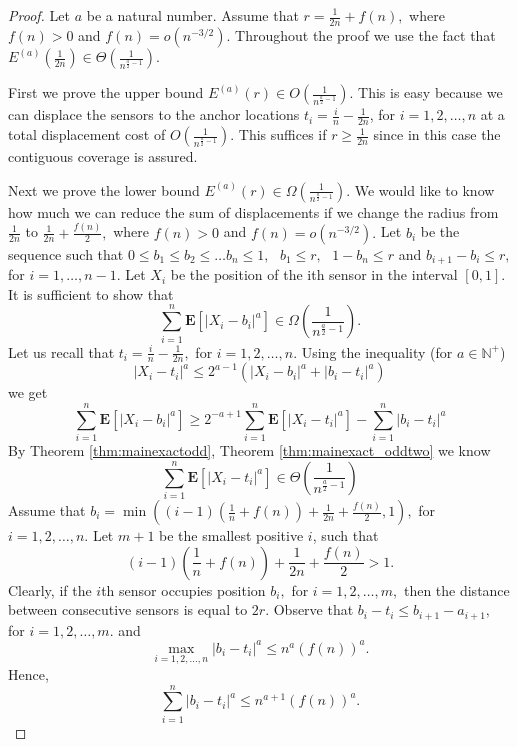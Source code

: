 \documentclass[final,5p,times,twocolumn]{elsarticle_mod}
\newcommand{\E}[1]{\mathbf{E}\left[#1\right]}
\begin{document}
\begin{proof} Let $a$ be a natural number.
Assume that $r=\frac{1}{2n}+f(n),$ where $f(n)>0$ and $f(n)=o(n^{-3/2}).$
Throughout the proof we use the fact that
$E^{(a)}\left(\frac{1}{2n}\right) \in \Theta\left(\frac{1}{n^{\frac{a}{2}-1}}\right).$

First we prove the upper bound
$E^{(a)}(r) \in O \left(\frac{1}{n^{\frac{a}{2}-1}}\right)$. This is easy because we can
displace the sensors to the anchor locations $t_i = \frac{i}{n}-\frac{1}{2n}$,
for $i=1,2,\ldots ,n$ at a total displacement cost of
$O\left(\frac{1}{n^{\frac{a}{2}-1}}\right).$ This suffices if $r \geq \frac{1}{2n}$
since in this case the contiguous coverage is assured.

Next we prove the lower bound
$E^{(a)}(r) \in \Omega \left(\frac{1}{n^{\frac{a}{2}-1}}\right)$.
We would like to know how much we can reduce
the sum of displacements if we change the radius
from $\frac{1}{2n}$
to $\frac{1}{2n}+\frac{f(n)}{2},$ where $f(n)>0$ and $f(n)=o(n^{-3/2}).$
Let $b_i$ be the sequence such that $0\le b_1\le b_2\le \dots b_n\le 1,\,\,$
$b_1\le r,\,\,$ $1-b_n\le r$ and $b_{i+1}-b_i\le r,$ for $i=1,\dots , n-1.$
Let $X_i$ be the position of the ith sensor in the interval $[0,1].$
It is sufficient to show that
$$
\sum_{i=1}^{n}\E{|X_i-b_i|^a}\in\Omega\left(\frac{1}{n^{\frac{a}{2}-1}}\right).
$$
Let us recall that $t_i=\frac{i}{n}-\frac{1}{2n},$ for $i=1,2,\dots ,n.$ Using the inequality
(for $a\in \mathbb{N}^{+}$)
$$
|X_i-t_i|^a\le 2^{a-1}\left(|X_i-b_i|^a+|b_i-t_i|^a\right)
$$
we get
\begin{equation}
\label{eq:mink}
\sum_{i=1}^{n}\E{|X_i-b_i|^a}\ge2^{-a+1}\sum_{i=1}^{n}\E{|X_i-t_i|^a}-\sum_{i=1}^{n}|b_i-t_i|^a
\end{equation}
By Theorem \ref{thm:mainexactodd}, Theorem \ref{thm:mainexact_oddtwo}
we know 
\begin{equation}
\label{eq:exest}
\sum_{i=1}^{n}\E{|X_i-t_i|^a}\in \Theta \left(\frac{1}{n^{\frac{a}{2}-1}}\right)
\end{equation}
Assume that $b_i=\min\left((i-1)\left(\frac{1}{n}+f(n)\right)+\frac{1}{2n}+\frac{f(n)}{2}, 1\right),$
for $i=1,2,\dots,n.$ Let $m+1$ be the smallest positive $i$, such that 
$$(i-1)\left(\frac{1}{n}+f(n)\right)+\frac{1}{2n}+\frac{f(n)}{2}>1.$$
Clearly, if the $i$th sensor occupies position $b_i,$ for $i=1,2,\dots,m,$ then the distance between consecutive sensors is equal to $2r.$
Observe that $b_i-t_i\le b_{i+1}-a_{i+1},$ for $i=1,2,\dots,m.$ and
$$\max_{i=1,2,\dots,n}|b_i-t_i|^a\le n^a (f(n))^a.$$ Hence,
$$\sum_{i=1}^{n}|b_i-t_i|^a\le n^{a+1} (f(n))^a.$$

\end{proof}
\end{document}
